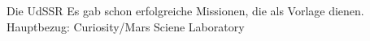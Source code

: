 Die UdSSR 
Es gab schon erfolgreiche Missionen, die als Vorlage dienen. Hauptbezug: Curiosity/Mars Sciene Laboratory